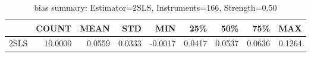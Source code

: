 \begin{table}[ht]
\centering
\caption{bias summary: Estimator=2SLS, Instruments=166, Strength=0.50}
\begin{tabular}{lrrrrrrrr}
\toprule
 & COUNT & MEAN & STD & MIN & 25\% & 50\% & 75\% & MAX \\
\midrule
2SLS & 10.0000 & 0.0559 & 0.0333 & -0.0017 & 0.0417 & 0.0537 & 0.0636 & 0.1264 \\
\bottomrule
\end{tabular}
\end{table}
